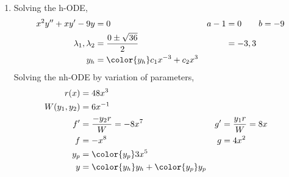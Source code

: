 \begin{enumerate}
    \item Solving the h-ODE,
          \begin{align}
              x^{2}y'' + xy' - 9y      & = 0                                      &
              a - 1                    & = 0 \qquad b = -9                          \\
              \lambda_{1}, \lambda_{2} & = \frac{0 \pm \sqrt{36}}{2}              &
                                       & = -3, 3                                    \\
              y_{h}                    & = {\color{y_h} c_{1}x^{-3} + c_{2}x^{3}}
          \end{align}
          Solving the nh-ODE by variation of parameters,
          \begin{align}
              r(x)            & = 48x^{3}                                     \\
              W(y_{1}, y_{2}) & = 6x^{-1}                                     \\
              f'              & = \frac{-y_{2}r}{W} = -8x^{7}               &
              g'              & = \frac{y_{1}r}{W} = 8x                       \\
              f               & = -x^{8}                                    &
              g               & = 4x^{2}                                      \\
              y_{p}           & = {\color{y_p} 3x^{5}}                        \\
              y               & = {\color{y_h} y_{h}} + {\color{y_p} y_{p}}
          \end{align}


\end{enumerate}
